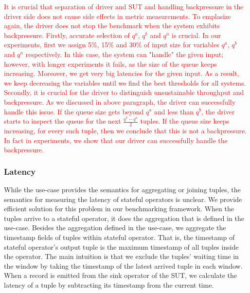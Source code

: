 \textcolor{red}{ It is crucial that separation of driver and SUT and handling backpressure in the driver side does not cause side effects in metric measurements. To emplasize again, the driver does not stop the benchmark when the system exhibits backpressure. Firstly, accurate selection of $q^{a}$, $q^{b}$ and $q^{n}$ is crucial. In our experiments, first we assign 5\%, 15\% and 30\% of input size for variables $q^{a}$, $q^{b}$ and $q^{n}$ respectively. In this case, the system can "handle" the given input; however, with longer experiments it fails, as the size of the queue keeps increasing. Moreover, we get very big latencies for the given input. As a result, we keep decreasing the variables until we find the best thresholds for all systems.    Secondly, it is crucial for the driver to distinguish unsustainable throughput and backpressure. As we discussed in above paragraph, the driver can successfully handle this issue. If the queue size gets beyond $q^{a}$ and less than $q^{b}$, the driver starts to inspect the queue for the next $\frac{q^{b} - q^{a}}{2}  $ tuples. If the queue size keeps increasing, for every such tuple, then we conclude that this is not a backpressure. In fact in experiments, we show that our driver can successfully handle the backpressure.}







\subsubsection{Latency}
\label{sec_latency}

While the use-case provides the semantics for aggregating or joining tuples, the semantics for measuring the latency of stateful operators is unclear.  We provide efficient solution for this problem in our benchmarking framework. When the tuples arrive to a stateful operator, it does the aggregation that is defined in the use-case. Besides the aggregation  defined in the use-case,  we aggregate the timestamp fields of tuples within stateful operator. That is, the timestamp of stateful operator's output tuple is the maximum timestamp of all tuples inside the operator.  The main intuition is that we exclude the tuples' waiting time in the window by taking the timestamp of the latest arrived tuple in each window. When a record is emitted from the sink operator of the SUT, we calculate the latency of a tuple by subtracting its timestamp from the current time.



